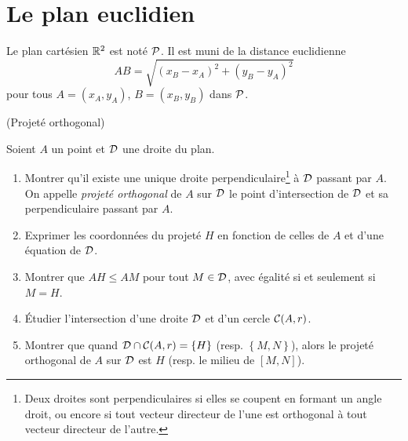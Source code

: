 \documentclass[a4paper,11pt,reqno]{amsart}
\begin{document}

\section{Le plan euclidien}

\begin{convention}
  Le plan cartésien $\mathbb{R}^2$ est noté $\mathcal{P}$. Il est muni de la distance euclidienne
  \[
    AB=\sqrt{(x_B-x_A)^2+(y_B-y_A)^2}
  \]
  pour tous $A=(x_A,y_A)$, $B=(x_B,y_B)$ dans $\mathcal{P}$.
\end{convention}


\begin{exo} (Projeté orthogonal)

  Soient $A$ un point et $\mathcal{D}$ une droite du plan.
  \begin{enumerate}
     \item Montrer qu'il existe une unique droite perpendiculaire\footnote{Deux droites sont perpendiculaires si elles se coupent en formant un angle droit, ou encore si tout vecteur directeur de l'une est orthogonal à tout vecteur directeur de l'autre.} à $\mathcal{D}$ passant par $A$. On appelle \emph{projeté orthogonal} de $A$ sur $\mathcal{D}$ le point d'intersection de $\mathcal{D}$ et sa perpendiculaire passant par $A$.
     \item Exprimer les coordonnées du projeté $H$ en fonction de celles de $A$ et d'une équation de $\mathcal{D}$.
     \item Montrer que $AH\leqslant AM$ pour tout $M \in \mathcal{D}$, avec égalité si et seulement si $M=H$.
     \item Étudier l'intersection d'une droite $\mathcal{D}$ et d'un cercle $\mathcal{C}(A,r)$.
     \item Montrer que quand $\mathcal{D} \cap \mathcal{C}(A,r) = \left\{ H \right\}$ (resp. $\left\{ M,N \right\}$), alors le projeté orthogonal de $A$ sur $\mathcal{D}$ est $H$ (resp. le milieu de $[M,N]$).
  \end{enumerate}
\end{exo}
\end{document}
